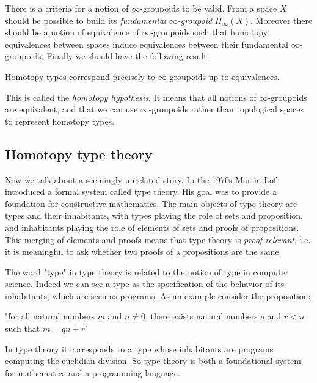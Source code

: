 \documentclass{article}
\newcommand{\sse}[1]{\medbreak \subsection{#1}}
\begin{document}
There is a criteria for a notion of $\infty$-groupoids to be valid. From a space $X$ should be possible to build its \emph{fundamental $\infty$-groupoid} $\Pi_\infty(X)$. Moreover there should be a notion of equivalence of $\infty$-groupoids such that homotopy equivalences between spaces induce equivalences between their fundamental $\infty$-groupoids. Finally we should have the following result:

\begin{center}
Homotopy types correspond precisely to $\infty$-groupoids up to equivalences.
\end{center} 

This is called the \emph{homotopy hypothesis}. It means that all notions of $\infty$-groupoids are equivalent, and that we can use $\infty$-groupoids rather than topological spaces to represent homotopy types.







\sse{Homotopy type theory}

Now we talk about a seemingly unrelated story. In the 1970s Martin-L{\"o}f introduced a formal system called type theory. His goal was to provide a foundation for constructive mathematics. The main objects of type theory are types and their inhabitants, with types playing the role of sets and proposition, and inhabitants playing the role of elements of sets and proofs of propositions. This merging of elements and proofs means that type theory is \emph{proof-relevant}, i.e. it is meaningful to ask whether two proofs of a propositions are the same.

The word "type" in type theory is related to the notion of type in computer science. Indeed we can see a type as the specification of the behavior of its inhabitants, which are seen as programs. As an example consider the proposition: 
\begin{center}
"for all natural numbers $m$ and $n\neq 0$, there exists natural numbers $q$ and $r<n$ such that $m = qn+r$"
\end{center}

In type theory it corresponds to a type whose inhabitants are programs computing the euclidian division. So type theory is both a foundational system for mathematics and a programming language.%
\end{document}
